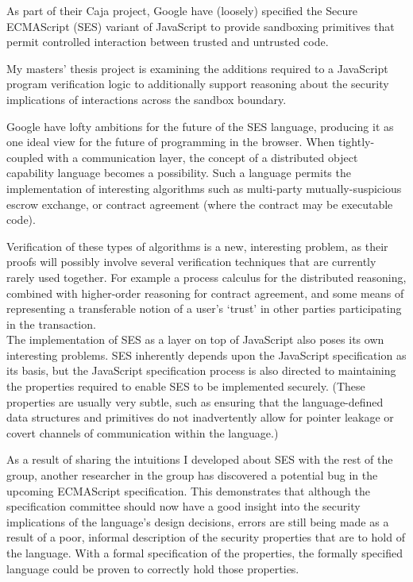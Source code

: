 \documentclass[a4paper]{article}
\begin{document}
As part of their Caja project, Google have (loosely) specified the Secure
ECMAScript (SES) variant of JavaScript to provide sandboxing primitives that
permit controlled interaction between trusted and untrusted code.

My masters' thesis project is examining the additions required to a JavaScript
program verification logic to additionally support reasoning about the security
implications of interactions across the sandbox boundary.

Google have lofty ambitions for the future of the SES language, producing it as
one ideal view for the future of programming in the browser. When
tightly-coupled with a communication layer, the concept of a distributed object
capability language becomes a possibility. Such a language permits the
implementation of interesting algorithms such as multi-party mutually-suspicious
escrow exchange, or contract agreement (where the contract may be executable
code).

Verification of these types of algorithms is a new, interesting problem, as
their proofs will possibly involve several verification techniques that are
currently rarely used together. For example a process calculus for the
distributed reasoning, combined with higher-order reasoning for contract
agreement, and some means of representing a transferable notion of a user's
`trust' in other parties participating in the transaction.
\\

The implementation of SES as a layer on top of JavaScript also poses its own
interesting problems. SES inherently depends upon the JavaScript specification
as its basis, but the JavaScript specification process is also directed to
maintaining the properties required to enable SES to be implemented securely.
(These properties are usually very subtle, such as ensuring that the
language-defined data structures and primitives do not inadvertently allow for
pointer leakage or covert channels of communication within the language.)

As a result of sharing the intuitions I developed about SES with the rest of the
group, another researcher in the group has discovered a potential bug in the
upcoming ECMAScript specification. This demonstrates that although the
specification committee should now have a good insight into the security
implications of the language's design decisions, errors are still being made as
a result of a poor, informal description of the security properties that are to
hold of the language. With a formal specification of the properties, the
formally specified language could be proven to correctly hold those properties.
\end{document}
